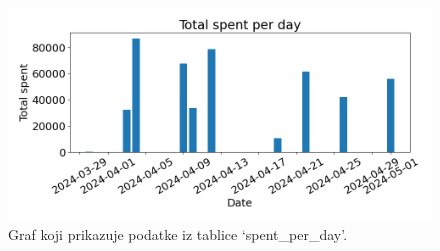\begin{figure}[h]
    \centering
    \includegraphics[width=0.8\linewidth]{images/myplot.png}
    \caption{Graf koji prikazuje podatke iz tablice `spent\_per\_day'.}
    \label{figure:spent_per_day_graph}
\end{figure}